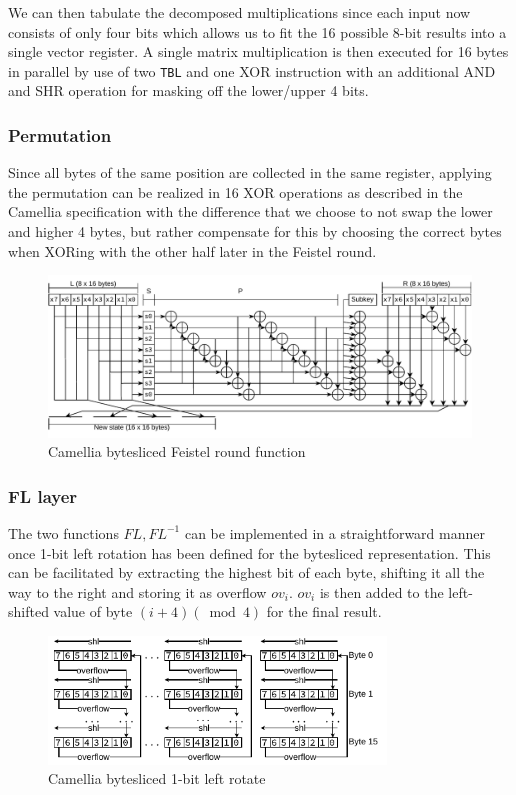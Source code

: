 We can then tabulate the decomposed multiplications since each input now
consists of only four bits which allows us to fit the 16 possible 8-bit results
into a single vector register. A single matrix multiplication is then executed
for 16 bytes in parallel by use of two \texttt{TBL} and one XOR instruction with
an additional AND and SHR operation for masking off the lower/upper 4 bits.

\subsubsection{Permutation}

Since all bytes of the same position are collected in the same register,
applying the permutation can be realized in 16 XOR operations as described in
the Camellia specification with the difference that we choose to not swap the
lower and higher 4 bytes, but rather compensate for this by choosing the
correct bytes when XORing with the other half later in the Feistel round.

\begin{figure}[h!]
    \centering
    \includegraphics[width=\textwidth]{Figures/camelliaround.pdf}
    \caption{Camellia bytesliced Feistel round function}
\end{figure}

\subsubsection{FL layer}

The two functions $FL,FL^{-1}$ can be implemented in a straightforward manner
once 1-bit left rotation has been defined for the bytesliced representation.
This can be facilitated by extracting the highest bit of each byte, shifting it
all the way to the right and storing it as overflow $ov_i$. $ov_i$ is then added
to the left-shifted value of byte $(i + 4) (\bmod 4)$ for the final result.

\begin{figure}[h!]
    \centering
    \includegraphics[width=0.8\textwidth]{Figures/camellia_bytesliced_rol.pdf}
    \caption{Camellia bytesliced 1-bit left rotate}
\end{figure}
